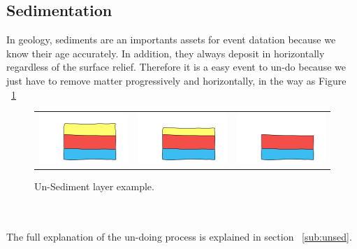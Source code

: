 \documentclass[12pt, a4paper]{report} %
\begin{document}
\subsection{Sedimentation}
In geology, sediments are an importants assets for event datation because we know their age accurately. In addition, they always deposit in horizontally regardless of the surface relief. Therefore it is a easy event to un-do because we just have to remove matter progressively and horizontally, in the way as Figure ~\ref{unsedeg}
\begin{figure}[H]
\centering
\begin{tabular}{@{}ccc@{}}
\includegraphics[width=.35\textwidth]{unSedimentDescription0.png}&
\includegraphics[width=.35\textwidth]{unSedimentDescription1.png}&
\includegraphics[width=.35\textwidth]{unSedimentDescription2.png}\\
\end{tabular}
\caption{Un-Sediment layer example.}
\label{unsedeg}
\end{figure}\\\\
The full explanation of the un-doing process is explained in section ~\ref{sub:unsed}.
\end{document}
